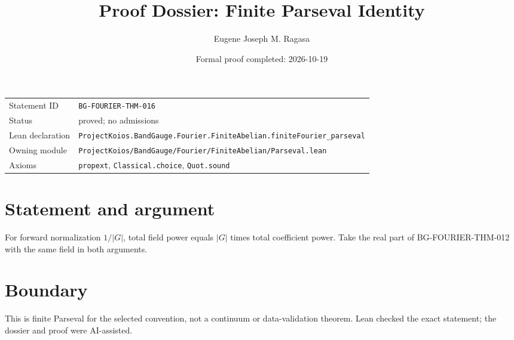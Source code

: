 \documentclass[11pt]{article}
\title{Proof Dossier: Finite Parseval Identity}
\author{Eugene Joseph M. Ragasa}
\date{Formal proof completed: 2026-10-19}
\begin{document}
\maketitle
\noindent\begin{tabularx}{\textwidth}{@{}lX@{}}\toprule
Statement ID & \texttt{BG-FOURIER-THM-016} \\
Status & proved; no admissions \\
Lean declaration & \texttt{ProjectKoios.BandGauge.Fourier.FiniteAbelian.}\newline\texttt{finiteFourier\_parseval} \\
Owning module & \texttt{ProjectKoios/BandGauge/Fourier/FiniteAbelian/Parseval.lean} \\
Axioms & \texttt{propext}, \texttt{Classical.choice}, \texttt{Quot.sound} \\
\bottomrule\end{tabularx}
\section{Statement and argument}
For forward normalization $1/|G|$, total field power equals $|G|$ times total coefficient power. Take the real part of BG-FOURIER-THM-012 with the same field in both arguments.
\section{Boundary}
This is finite Parseval for the selected convention, not a continuum or data-validation theorem. Lean checked the exact statement; the dossier and proof were AI-assisted.
\end{document}
